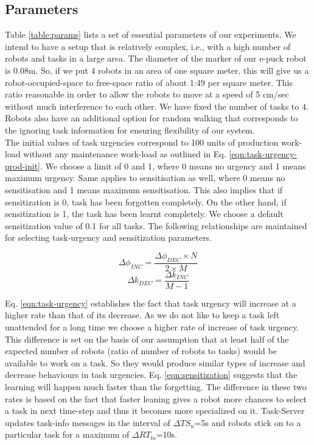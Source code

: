 \documentclass{llncs}
\begin{document}
\subsection{Parameters}
Table \ref{table:params} lists a set of essential parameters of our experiments. We intend to have a setup that is relatively complex, i.e., with a high number of robots and tasks in a large area. The diameter of the marker of our e-puck robot is 0.08m. So, if we put 4 robots in an area of one square meter, this will give us a robot-occupied-space to free-space ratio of about 1:49 per square meter. This ratio reasonable in order to allow the robots to move at a speed of 5 cm/sec  without much interference to each other. We have fixed the number of tasks to 4. Robots also have an additional option for random walking that corresponds to the ignoring task information for ensuring flexibility of our system.\\
The initial values of task urgencies correspond to 100 units of production work-load without any maintenance work-load as outlined in Eq. \ref{eqn:task-urgency-prod-init}. We choose a limit of 0 and 1, where 0 means no urgency and 1 means maximum urgency. Same applies to sensitisation as well, where 0 means no sensitisation and 1 means maximum sensitisation. This also implies that if sensitization is 0, task has been forgotten completely. On the other hand, if sensitization is 1, the task has been learnt completely. We choose a default sensitization value of 0.1 
for all tasks. The following relationships are maintained for selecting task-urgency and sensitization parameters.
\begin{small}
\begin{equation}
\Delta\phi_{INC} =  \frac{\Delta\phi_{DEC} \times N}{2 \times M}
\label{eqn:task-urgency}
\end{equation}
%
\begin{equation}
\Delta k_{DEC} = \frac{\Delta k_{INC}} {M - 1} 
\label{eqn:sensitization}
\end{equation}
\end{small}
%
Eq. \ref{eqn:task-urgency} establishes the fact that task urgency will increase at a higher rate than that of its decrease. As we do not like to keep a task left unattended for a long time we choose a higher rate of increase of task urgency. This difference is set on the basis of our assumption that at least half of the expected number of robots (ratio of number of robots to tasks) would be available to work on a task. So they would produce similar types of increase and decrease behaviours in task urgencies.
Eq. \ref{eqn:sensitization} suggests that the learning will happen much faster than the forgetting. The difference in these two rates is based on the fact that faster leaning gives a robot more chances to select  a task in next time-step and thus it becomes more specialized on it.  Task-Server updates task-info messages in the interval of $\Delta TS_u$=5s and robots stick on to a particular task for a maximum of  $\Delta RT_{to}$=10s.
\end{document}
